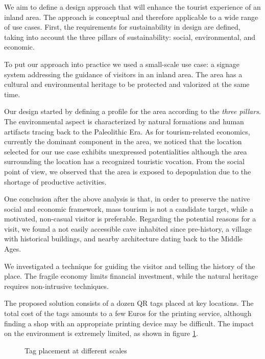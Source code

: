 \documentclass[sustainability,article,submit,pdftex,moreauthors]{Definitions/mdpi}
\begin{document}
We aim to define a design approach that will enhance the tourist experience of an inland area. The approach is conceptual and therefore applicable to a wide range of use cases. First, the requirements for sustainability in design are defined, taking into account the three pillars of sustainability: social, environmental, and economic.

To put our approach into practice we used a small-scale use case: a signage system addressing the guidance of visitors in an inland area. The area has a cultural and environmental heritage to be protected and valorized at the same time.

Our design started by defining a profile for the area according to the \emph{three pillars}. The environmental aspect is characterized by natural formations and human artifacts tracing back to the Paleolithic Era. As for tourism-related economics, currently the dominant component in the area, we noticed that the location selected for our use case exhibits unexpressed potentialities although the area surrounding the location has a recognized touristic vocation. From the social point of view, we observed that the area is exposed to depopulation due to the shortage of productive activities.

One conclusion after the above analysis is that, in order to preserve the native social and economic framework, mass tourism is not a candidate target, while a motivated, non-casual visitor is preferable. Regarding the potential reasons for a visit, we found a not easily accessible cave inhabited since pre-history, a village with historical buildings, and nearby architecture dating back to the Middle Ages.

We investigated a technique for guiding the visitor and telling the history of the place. The fragile economy limits financial investment, while the natural heritage requires non-intrusive techniques.

The proposed solution consists of a dozen QR tags placed at key locations. The total cost of the tags amounts to a few Euros for the printing service, although finding a shop with an appropriate printing device may be difficult. The impact on the environment is extremely limited, as shown in figure \ref{fig:TagPlacement}.

\begin{figure}
\hfill
{}
\caption{Tag placement at different scales}
\label{fig:TagPlacement}
\end{figure}
\end{document}

